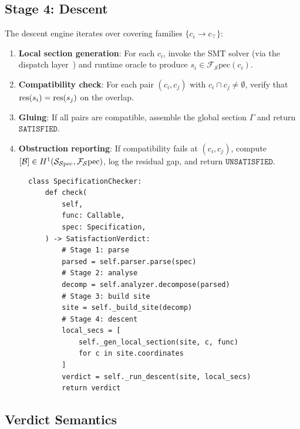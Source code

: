 \documentclass[11pt]{article}
\newcommand{\Spec}{\mathcal{S}\mathrm{pec}}        %
\newcommand{\GlobalSec}{\Gamma}                     %
\newcommand{\LocalSec}[1]{s_{#1}}                  %
\newcommand{\SAT}{\texttt{SATISFIED}}               %
\newcommand{\UNSAT}{\texttt{UNSATISFIED}}           %
\newcommand{\SatSite}{{\Site_{\Spec}}}                %
\newcommand{\ObstrClass}{\mathcal{B}}               %
\begin{document}
\subsection{Stage 4: Descent}\label{sec:descent-stage}

The descent engine iterates over covering families $\{c_i \to c_\top\}$:

\begin{enumerate}[leftmargin=2em,label=(\arabic*)]
  \item \textbf{Local section generation}:
        For each $c_i$, invoke the SMT solver (via the dispatch
        layer~\cite{JuGeo05}) and runtime oracle to produce
        $\LocalSec{i} \in \mathcal{F}_\Spec(c_i)$.
  \item \textbf{Compatibility check}:
        For each pair $(c_i, c_j)$ with $c_i \cap c_j \neq \emptyset$,
        verify that $\res(\LocalSec{i}) = \res(\LocalSec{j})$ on the
        overlap.
  \item \textbf{Gluing}:
        If all pairs are compatible, assemble the global section
        $\GlobalSec$ and return $\SAT$.
  \item \textbf{Obstruction reporting}:
        If compatibility fails at $(c_i, c_j)$, compute
        $[\ObstrClass] \in \Hcoh{1}(\SatSite, \mathcal{F}_\Spec)$,
        log the residual gap, and return $\UNSAT$.
\end{enumerate}

\begin{figure}[h]
\centering
\begin{lstlisting}[style=jugeo-python,caption={Simplified
  SpecificationChecker.check() method},label=lst:checker]
class SpecificationChecker:
    def check(
        self,
        func: Callable,
        spec: Specification,
    ) -> SatisfactionVerdict:
        # Stage 1: parse
        parsed = self.parser.parse(spec)
        # Stage 2: analyse
        decomp = self.analyzer.decompose(parsed)
        # Stage 3: build site
        site = self._build_site(decomp)
        # Stage 4: descent
        local_secs = [
            self._gen_local_section(site, c, func)
            for c in site.coordinates
        ]
        verdict = self._run_descent(site, local_secs)
        return verdict
\end{lstlisting}
\end{figure}

\subsection{Verdict Semantics}\label{sec:verdicts}
\end{document}
